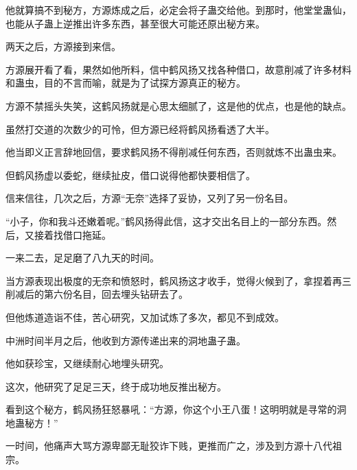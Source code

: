 \begin{this_body}
他就算搞不到秘方，方源炼成之后，必定会将子蛊交给他。到那时，他堂堂蛊仙，也能从子蛊上逆推出许多东西，甚至很大可能还原出秘方来。

两天之后，方源接到来信。

方源展开看了看，果然如他所料，信中鹤风扬又找各种借口，故意削减了许多材料和蛊虫，目的不言而喻，就是为了试探方源真正的秘方。

方源不禁摇头失笑，这鹤风扬就是心思太细腻了，这是他的优点，也是他的缺点。

虽然打交道的次数少的可怜，但方源已经将鹤风扬看透了大半。

他当即义正言辞地回信，要求鹤风扬不得削减任何东西，否则就炼不出蛊虫来。

但鹤风扬虚以委蛇，继续扯皮，借口说得他都快要相信了。

信来信往，几次之后，方源“无奈”选择了妥协，又列了另一份名目。

“小子，你和我斗还嫩着呢。”鹤风扬得此信，这才交出名目上的一部分东西。然后，又接着找借口拖延。

一来二去，足足磨了八九天的时间。

当方源表现出极度的无奈和愤怒时，鹤风扬这才收手，觉得火候到了，拿捏着再三削减后的第六份名目，回去埋头钻研去了。

但他炼道造诣不佳，苦心研究，又加试炼了多次，都见不到成效。

中洲时间半月之后，他收到方源传递出来的洞地蛊子蛊。

他如获珍宝，又继续耐心地埋头研究。

这次，他研究了足足三天，终于成功地反推出秘方。

看到这个秘方，鹤风扬狂怒暴吼：“方源，你这个小王八蛋！这明明就是寻常的洞地蛊秘方！”

一时间，他痛声大骂方源卑鄙无耻狡诈下贱，更推而广之，涉及到方源十八代祖宗。

\end{this_body}

